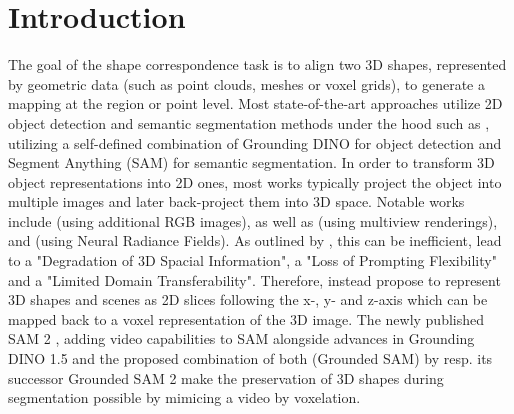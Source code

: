 \section{Introduction}
\label{sec:intro}

The goal of the shape correspondence task is to align two 3D shapes, represented by geometric data (such as point clouds, meshes or voxel grids), to generate a mapping at the region or point level. Most state-of-the-art approaches utilize 2D object detection and semantic segmentation methods under the hood such as \citet{abdelreheem_zero-shot_2023}, utilizing a self-defined combination of Grounding DINO \cite{liu_grounding_2024} for object detection and Segment Anything (SAM) \cite{kirillov_segment_2023} for semantic segmentation. In order to transform 3D object representations into 2D ones, most works typically project the object into multiple images and later back-project them into 3D space. Notable works include \citet{yang_sam3d_2023} (using additional RGB images), \citet{liu_partslip_2022} as well as \citet{abdelreheem_zero-shot_2023} (using multiview renderings), and \citet{cen_segment_2023} (using Neural Radiance Fields). As outlined by \citet{guo_sam2point_2024}, this can be inefficient, lead to a "Degradation of 3D Spacial Information", a "Loss of Prompting Flexibility" and a "Limited Domain Transferability". Therefore, \citet{guo_sam2point_2024} instead propose to represent 3D shapes and scenes as 2D slices following the x-, y- and z-axis which can be mapped back to a voxel representation of the 3D image. The newly published SAM 2 \cite{ravi_sam_2024}, adding video capabilities to SAM alongside advances in Grounding DINO 1.5 \cite{ren_grounding_2024} and the proposed combination of both (Grounded SAM) by \citet{ren_grounded_2024} resp. its successor Grounded SAM 2 make the preservation of 3D shapes during segmentation possible by mimicing a video by voxelation.